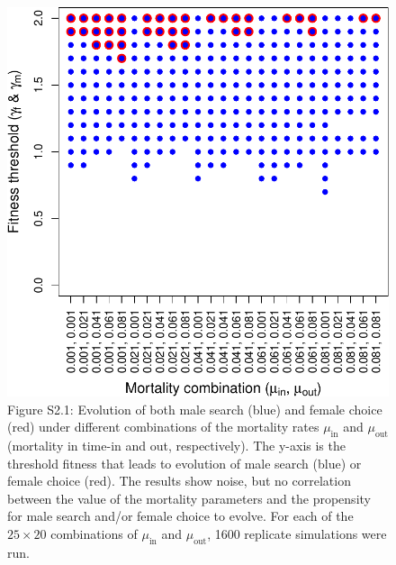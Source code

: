 \documentclass[
]{article}
\begin{document}
\clearpage

\captionsetup{labelformat=empty}

\begin{figure}
\centering
\includegraphics{SI_files/figure-latex/unnamed-chunk-3-1.pdf}
\caption{Figure S2.1: Evolution of both male search (blue) and female
choice (red) under different combinations of the mortality rates
\(\mu_{\mathrm{in}}\) and \(\mu_{\mathrm{out}}\) (mortality in time-in
and out, respectively). The y-axis is the threshold fitness that leads
to evolution of male search (blue) or female choice (red). The results
show noise, but no correlation between the value of the mortality
parameters and the propensity for male search and/or female choice to
evolve. For each of the \(25 \times 20\) combinations of
\(\mu_{\mathrm{in}}\) and \(\mu_{\mathrm{out}}\), 1600 replicate
simulations were run.}
\end{figure}

\captionsetup{labelformat=default}

\clearpage

\captionsetup{labelformat=empty}
\end{document}
